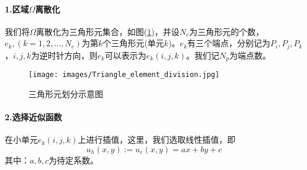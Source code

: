             \paragraph{1.区域$\Omega$离散化}
            我们将$\Omega$离散化为三角形元集合，如图(\ref{fig:三角形元划分示意图})，并设$N_e$为三角形元的个数，$e_k,(k = 1,2,\dots,N_e)$为第$k$个三角形元(单元$k$)。$e_k$有三个端点，分别记为$P_i,P_j,P_k$，$i,j,k$为逆时针方向，则$e_k$可以表示为$e_k(i,j,k)$。我们记$N_p$为端点数。\\
            \begin{figure}[H]
            \centering
            \texttt{[image: images/Triangle\_element\_division.jpg]}
            \caption{三角形元划分示意图}
            \label{fig:三角形元划分示意图}
            \end{figure}
            \paragraph{2.选择近似函数}
            在小单元$e_k(i,j,k)$上进行插值，这里，我们选取线性插值，即
            \[
                u_h(x,y) := u_e(x,y) = ax+by+c
            \]
            其中：$a,b,c$为待定系数。
